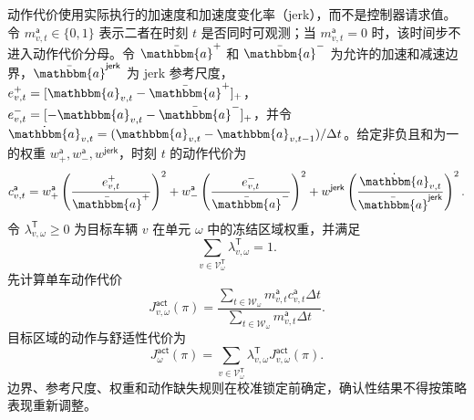 \documentclass[10pt,a4paper,twocolumn]{article}
\begin{document}
动作代价使用实际执行的加速度和加速度变化率（jerk），而不是控制器请求值。令 $m_{v,t}^{\mathsf a}\in\{0,1\}$ 表示二者在时刻 $t$ 是否同时可观测；当 $m_{v,t}^{\mathsf a}=0$ 时，该时间步不进入动作代价分母。令 $\bar{\mathbbm{a}}^{+}$ 和 $\bar{\mathbbm{a}}^{-}$ 为允许的加速和减速边界，$\bar{\mathbbm{a}}^{\mathsf{jerk}}$ 为 jerk 参考尺度，$e_{v,t}^{+}=[\mathbbm{a}_{v,t}-\bar{\mathbbm{a}}^{+}]_+$，$e_{v,t}^{-}=[-\mathbbm{a}_{v,t}-\bar{\mathbbm{a}}^{-}]_+$，并令 $\dot{\mathbbm{a}}_{v,t}=(\mathbbm{a}_{v,t}-\mathbbm{a}_{v,t-1})/\Delta t$。给定非负且和为一的权重 $w_{+}^{\mathsf a},w_{-}^{\mathsf a},w^{\mathsf{jerk}}$，时刻 $t$ 的动作代价为
\begin{equation*}
c_{v,t}^{\mathsf a}=
w_{+}^{\mathsf a}\left(\frac{e_{v,t}^{+}}{\bar{\mathbbm{a}}^{+}}\right)^2+
w_{-}^{\mathsf a}\left(\frac{e_{v,t}^{-}}{\bar{\mathbbm{a}}^{-}}\right)^2+
w^{\mathsf{jerk}}\left(\frac{\dot{\mathbbm{a}}_{v,t}}{\bar{\mathbbm{a}}^{\mathsf{jerk}}}\right)^2.
\end{equation*}
令 $\lambda_{v,\omega}^{\mathsf T}\geq0$ 为目标车辆 $v$ 在单元 $\omega$ 中的冻结区域权重，并满足
\begin{equation*}
\sum_{v\in\mathcal V^{\mathsf T}_{\omega}}\lambda_{v,\omega}^{\mathsf T}=1.
\end{equation*}
先计算单车动作代价
\begin{equation*}
J_{v,\omega}^{\mathsf{act}}(\pi)
=\frac{\sum_{t\in\mathcal W_\omega}m_{v,t}^{\mathsf a}
c_{v,t}^{\mathsf a}\Delta t}
{\sum_{t\in\mathcal W_\omega}m_{v,t}^{\mathsf a}\Delta t}.
\end{equation*}
目标区域的动作与舒适性代价为
\begin{equation*}
J_{\omega}^{\mathsf{act}}(\pi)
=\sum_{v\in\mathcal V^{\mathsf T}_{\omega}}
\lambda_{v,\omega}^{\mathsf T}J_{v,\omega}^{\mathsf{act}}(\pi).
\end{equation*}
边界、参考尺度、权重和动作缺失规则在校准锁定前确定，确认性结果不得按策略表现重新调整。
\end{document}
